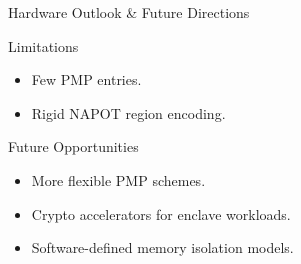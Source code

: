 \documentclass[aspectratio=169]{beamer}
\begin{document}
\begin{frame}{Hardware Outlook \& Future Directions}
\begin{block}{Limitations}
\begin{itemize}
    \item Few PMP entries.
    \item Rigid NAPOT region encoding.
\end{itemize}
\end{block}

\begin{alertblock}{Future Opportunities}
\begin{itemize}
    \item More flexible PMP schemes.
    \item Crypto accelerators for enclave workloads.
    \item Software-defined memory isolation models.
\end{itemize}
\end{alertblock}
\end{frame}




\end{document}
